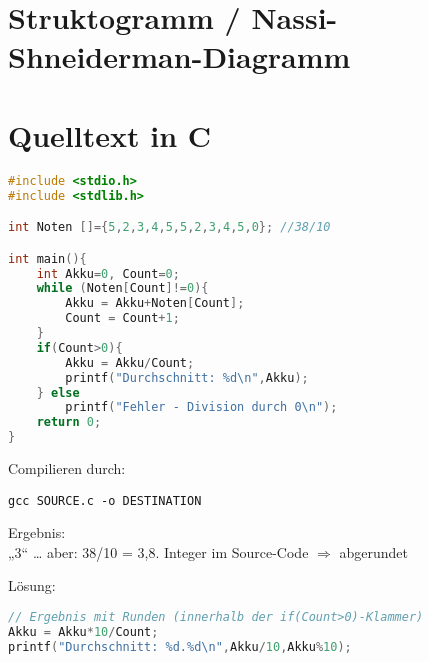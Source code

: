 \section[Struktogramm]{Struktogramm / Nassi-Shneiderman-Diagramm}


\section{Quelltext in C}

\begin{lstlisting}[language=C]
#include <stdio.h>
#include <stdlib.h>

int Noten []={5,2,3,4,5,5,2,3,4,5,0}; //38/10

int main(){
	int Akku=0, Count=0;
	while (Noten[Count]!=0){
		Akku = Akku+Noten[Count];
		Count = Count+1;
	}
	if(Count>0){
		Akku = Akku/Count;
		printf("Durchschnitt: %d\n",Akku);
	} else
		printf("Fehler - Division durch 0\n");
	return 0;
}
\end{lstlisting}

Compilieren durch: 
\begin{lstlisting}
gcc SOURCE.c -o DESTINATION
\end{lstlisting}

Ergebnis:\\
„3“ … aber: 38/10 = 3,8. Integer im Source-Code $\Rightarrow$ abgerundet

Lösung:
\begin{lstlisting}[language=C]
// Ergebnis mit Runden (innerhalb der if(Count>0)-Klammer)
Akku = Akku*10/Count;
printf("Durchschnitt: %d.%d\n",Akku/10,Akku%10);
\end{lstlisting}

